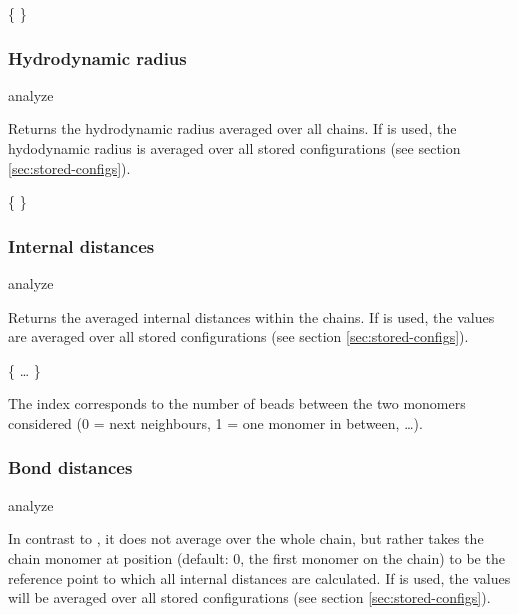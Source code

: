 \begin{essyntex}
\begin{code}
\{     \}
\end{code}

\subsubsection{Hydrodynamic radius}
\begin{essyntax}
  analyze  
\end{essyntax}
Returns the hydrodynamic radius averaged over all chains.  If
 is used, the hydodynamic radius is averaged over all stored
configurations (see section \vref{sec:stored-configs}).
\begin{code}
\{   \}
\end{code}

\subsubsection{Internal distances}
\begin{essyntax}
 analyze  
\end{essyntax}
Returns the averaged internal distances within the chains.  If
 is used, the values are averaged over all stored
configurations (see section \vref{sec:stored-configs}).
\begin{code}
\{   \dots {} \}
\end{code}
The index corresponds to the number of beads between the two monomers
considered (0 = next neighbours, 1 = one monomer in between, \dots).

\subsubsection{Bond distances}
\begin{essyntax}
  analyze   
\end{essyntax}
In contrast to , it does not average over
the whole chain, but rather takes the chain monomer at position
 (default: $0$, \ie the first monomer on the chain) to be
the reference point to which all internal distances are calculated. If
 is used, the values will be averaged over all stored
configurations (see section \vref{sec:stored-configs}).


\end{essyntex}
